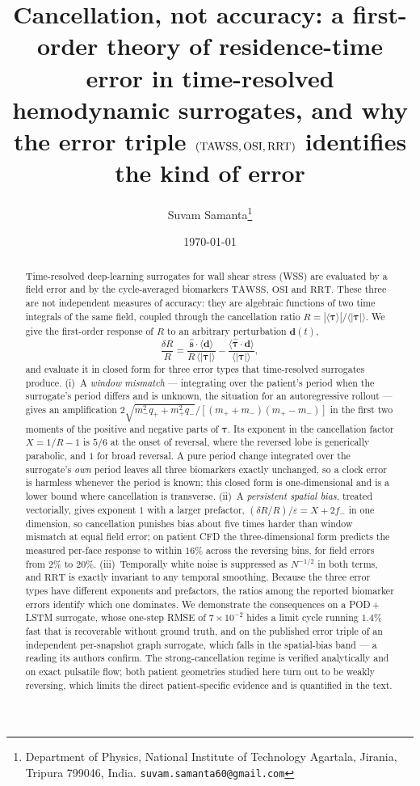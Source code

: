 \documentclass[11pt,a4paper]{article}
\title{Cancellation, not accuracy: a first-order theory of residence-time
error in time-resolved hemodynamic surrogates, and why the error triple
$(\TAWSS,\OSI,\RRT)$ identifies the kind of error}
\author{Suvam Samanta\thanks{Department of Physics, National Institute of
Technology Agartala, Jirania, Tripura 799046, India.
\texttt{suvam.samanta60@gmail.com}}}
\date{\today}
\newcommand{\TAWSS}{\mathrm{TAWSS}}
\newcommand{\OSI}{\mathrm{OSI}}
\newcommand{\RRT}{\mathrm{RRT}}
\newcommand{\eps}{\varepsilon}
\begin{document}
\maketitle

\begin{abstract}
Time-resolved deep-learning surrogates for wall shear stress (WSS) are
evaluated by a field error and by the cycle-averaged biomarkers $\TAWSS$,
$\OSI$ and $\RRT$. These three are not independent measures of accuracy:
they are algebraic functions of two time integrals of the same field,
coupled through the cancellation ratio
$R=|\langle\boldsymbol\tau\rangle|/\langle|\boldsymbol\tau|\rangle$. We give
the first-order response of $R$ to an arbitrary perturbation $\mathbf d(t)$,
\[
\frac{\delta R}{R}=
\frac{\hat{\mathbf s}\cdot\langle\mathbf d\rangle}{R\,\langle|\boldsymbol\tau|\rangle}
-\frac{\langle\hat{\boldsymbol\tau}\cdot\mathbf d\rangle}{\langle|\boldsymbol\tau|\rangle},
\]
and evaluate it in closed form for three error types that time-resolved
surrogates produce. (i)~A \emph{window mismatch} --- integrating over the
patient's period when the surrogate's period differs and is unknown, the
situation for an autoregressive rollout --- gives an amplification
$2\sqrt{m_-^2q_++m_+^2q_-}/[(m_++m_-)(m_+-m_-)]$ in the first two moments of
the positive and negative parts of $\boldsymbol\tau$. Its exponent in the
cancellation factor $X=1/R-1$ is $5/6$ at the onset of reversal, where the
reversed lobe is generically parabolic, and $1$ for broad reversal. A pure
period change integrated over the surrogate's \emph{own} period leaves all
three biomarkers exactly unchanged, so a clock error is harmless whenever the
period is known; this closed form is one-dimensional and is a lower bound
where cancellation is transverse. (ii)~A \emph{persistent spatial bias},
treated vectorially, gives exponent $1$
with a larger prefactor, $(\delta R/R)/\eps=X+2f_-$ in one dimension, so
cancellation punishes bias about five times harder than window mismatch at
equal field error; on patient CFD the three-dimensional form predicts the
measured per-face response to within $16\%$ across the reversing bins, for
field errors from $2\%$ to $20\%$.
(iii)~Temporally white noise is suppressed as $N^{-1/2}$ in both terms, and
$\RRT$ is exactly invariant to any temporal smoothing. Because the three
error types have different exponents and prefactors, the ratios among the
reported biomarker errors identify which one dominates. We demonstrate the
consequences on a POD\,+\,LSTM surrogate, whose one-step RMSE of
$7\times10^{-2}$ hides a limit cycle running $1.4\%$ fast that is recoverable
without ground truth, and on the published error triple of an independent
per-snapshot graph surrogate, which falls in the spatial-bias band --- a
reading its authors confirm. The strong-cancellation regime is verified
analytically and on exact pulsatile flow; both patient geometries studied
here turn out to be weakly reversing, which limits the direct
patient-specific evidence and is quantified in the text.
\end{abstract}
\end{document}
